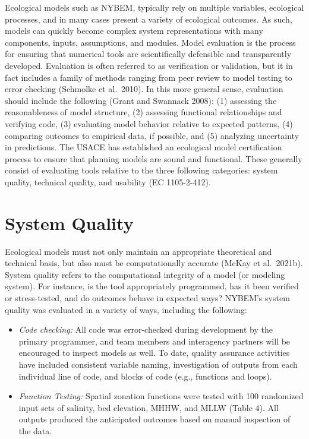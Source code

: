 \documentclass[
]{book}
\begin{document}
Ecological models such as NYBEM, typically rely on multiple variables, ecological processes, and in many cases present a variety of ecological outcomes. As such, models can quickly become complex system representations with many components, inputs, assumptions, and modules. Model evaluation is the process for ensuring that numerical tools are scientifically defensible and transparently developed. Evaluation is often referred to as verification or validation, but it in fact includes a family of methods ranging from peer review to model testing to error checking (Schmolke et al.~2010). In this more general sense, evaluation should include the following (Grant and Swannack 2008): (1) assessing the reasonableness of model structure, (2) assessing functional relationships and verifying code, (3) evaluating model behavior relative to expected patterns, (4) comparing outcomes to empirical data, if possible, and (5) analyzing uncertainty in predictions. The USACE has established an ecological model certification process to ensure that planning models are sound and functional. These generally consist of evaluating tools relative to the three following categories: system quality, technical quality, and usability (EC 1105-2-412).

\hypertarget{system-quality}{%
\section{System Quality}\label{system-quality}}

Ecological models must not only maintain an appropriate theoretical and technical basis, but also must be computationally accurate (McKay et al.~2021b). System quality refers to the computational integrity of a model (or modeling system). For instance, is the tool appropriately programmed, has it been verified or stress-tested, and do outcomes behave in expected ways? NYBEM's system quality was evaluated in a variety of ways, including the following:

\begin{itemize}
\item
  \emph{Code checking:} All code was error-checked during development by the primary programmer, and team members and interagency partners will be encouraged to inspect models as well. To date, quality assurance activities have included consistent variable naming, investigation of outputs from each individual line of code, and blocks of code (e.g., functions and loops).
\item
  \emph{Function Testing:} Spatial zonation functions were tested with 100 randomized input sets of salinity, bed elevation, MHHW, and MLLW (Table 4). All outputs produced the anticipated outcomes based on manual inspection of the data.
\end{itemize}
\end{document}
